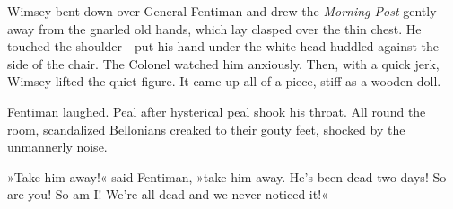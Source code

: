 Wimsey bent down over General Fentiman and drew the \textit{Morning Post} gently away from the gnarled old hands, which lay clasped over the thin chest. He touched the shoulder\allowbreak---\allowbreak put his hand under the white head huddled against the side of the chair. The Colonel watched him anxiously. Then, with a quick jerk, Wimsey lifted the quiet figure. It came up all of a piece, stiff as a wooden doll.

Fentiman laughed. Peal after hysterical peal shook his throat. All round the room, scandalized Bellonians creaked to their gouty feet, shocked by the unmannerly noise.

»Take him away!« said Fentiman, »take him away. He's been dead two days! So are you! So am I! We're all dead and we never noticed it!«
